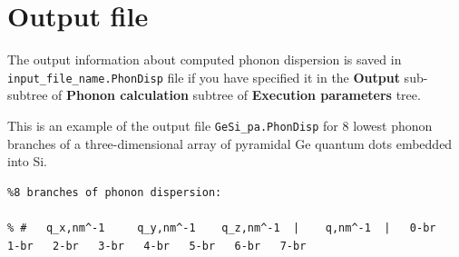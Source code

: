 \documentclass[12pt]{article}
\begin{document}
\section{Output file}
The output information about computed phonon dispersion is  saved in 
{\tt input\_file\_name.PhonDisp} file if you have specified it in the
{\bf Output} sub-subtree of {\bf Phonon calculation} subtree of {\bf
Execution parameters} tree.

This is an example of the output file {\tt GeSi\_pa.PhonDisp}  for 8 lowest phonon branches of
a three-dimensional array of pyramidal Ge quantum dots embedded into Si.
{\tiny
\begin{verbatim}
%8 branches of phonon dispersion:

% #   q_x,nm^-1     q_y,nm^-1    q_z,nm^-1  |    q,nm^-1  |   0-br   1-br   2-br   3-br   4-br   5-br   6-br   7-br  


\end{verbatim}}
\end{document}
